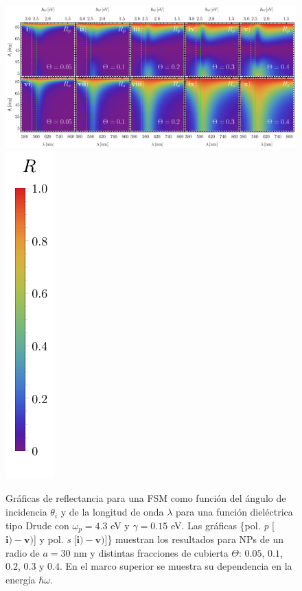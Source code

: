 \documentclass[letterpaper,11pt] {article}
\begin{document}
	\begin{figure}[h!]\centering
\includegraphics[width = .9\linewidth	]{4-Wp4FSMThetaVar/0-2D_Grid.png}%
\includegraphics[scale=.85, trim={00 -5 00 00}, clip]{0-RBar_v}
	\caption{Gráficas de reflectancia para una FSM como función del ángulo de incidencia $\theta_i$ y de la longitud de onda $\lambda$ para una función dieléctrica tipo Drude con $\omega_p=4. 3$ eV  y  $\gamma=0. 15$ eV.  Las gráficas \{pol.  \emph{p} [$\mathbf{i)-v)}$] y pol.  \emph{s} [$\mathbf{i)-v)}$]\} muestran los resultados para NPs de un radio de $a=30$ nm y distintas fracciones de cubierta $\Theta$: $0. 05$, $0. 1$, $0. 2$, $0. 3$ y $0. 4$.  En el marco superior se muestra su dependencia en la energía $\hbar\omega$. }	\label{fig:R-FSM}	
	\end{figure}						
					
\end{document}
